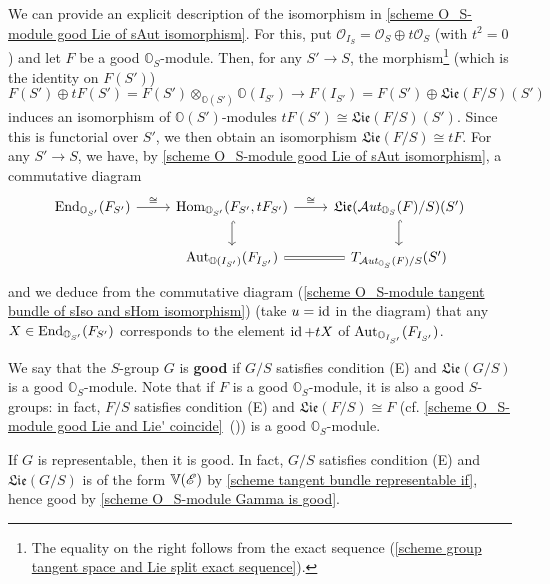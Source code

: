 \begin{remark}\label{scheme tangent space of Aut and infinitesimal endomorphism}
We can provide an explicit description of the isomorphism in \cref{scheme O_S-module good Lie of sAut isomorphism}. For this, put $\mathscr{O}_{I_S}=\mathscr{O}_S\oplus t\mathscr{O}_S$ (with $t^2=0$) and let $F$ be a good $\mathbb{O}_S$-module. Then, for any $S'\to S$, the morphism\footnote{The equality on the right follows from the exact sequence (\ref{scheme group tangent space and Lie split exact sequence}).} (which is the identity on $F(S')$)
\[F(S')\oplus tF(S')=F(S')\otimes_{\mathbb{O}(S')}\mathbb{O}(I_{S'})\to F(I_{S'})=F(S')\oplus\mathfrak{Lie}(F/S)(S')\]
induces an isomorphism of $\mathbb{O}(S')$-modules $tF(S')\cong\mathfrak{Lie}(F/S)(S')$. Since this is functorial over $S'$, we then obtain an isomorphism $\mathfrak{Lie}(F/S)\cong tF$. For any $S'\to S$, we have, by \cref{scheme O_S-module good Lie of sAut isomorphism}, a commutative diagram
\[\begin{tikzcd}
\End_{\mathbb{O}_{S'}}(F_{S'})\ar[r,"\cong"]&\Hom_{\mathbb{O}_{S'}}(F_{S'},tF_{S'})\ar[r,"\cong"]\ar[d,hook]&\mathfrak{Lie}(\sAut_{\mathbb{O}_S}(F)/S)(S')\ar[d,hook]\\
&\Aut_{\mathbb{O}(I_{S'})}(F_{I_{S'}})\ar[r,equal]&T_{\sAut_{\mathbb{O}_S}(F)/S}(S')
\end{tikzcd}\]
and we deduce from the commutative diagram (\ref{scheme O_S-module tangent bundle of sIso and sHom isomorphism}) (take $u=\operatorname{id}$ in the diagram) that any $X\in\mathrm{End}_{\mathbb{O}_{S'}}(F_{S'})$ corresponds to the element $\operatorname{id}+tX$ of $\mathrm{Aut}_{\mathbb{O}_{I_{S'}}}(F_{I_{S'}})$.
\end{remark}

We say that the $S$-group $G$ is \textbf{good} if $G/S$ satisfies condition (E) and $\mathfrak{Lie}(G/S)$ is a good $\mathbb{O}_S$-module. Note that if $F$ is a good $\mathbb{O}_S$-module, it is also a good $S$-groups: in fact, $F/S$ satisfies condition (E) and $\mathfrak{Lie}(F/S)\cong F$ (cf. \cref{scheme O_S-module good Lie and Lie' coincide}~()) is a good $\mathbb{O}_S$-module.

\begin{example}\label{scheme group representable is good}
If $G$ is representable, then it is good. In fact, $G/S$ satisfies condition (E) and $\mathfrak{Lie}(G/S)$ is of the form $\mathbb{V}(\mathscr{E})$ by \cref{scheme tangent bundle representable if}, hence good by \cref{scheme O_S-module Gamma is good}.
\end{example}

